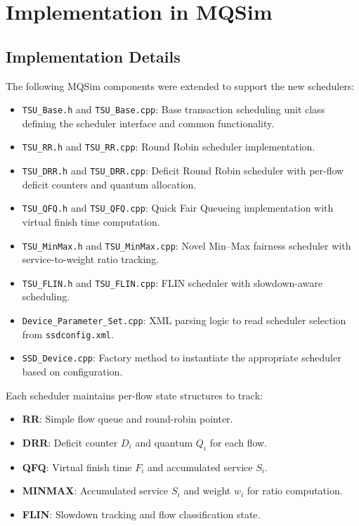 \documentclass[11pt]{article}
\begin{document}
\section{Implementation in MQSim}

\subsection{Implementation Details}

The following MQSim components were extended to support the new schedulers:

\begin{itemize}
    \item \texttt{TSU\_Base.h} and \texttt{TSU\_Base.cpp}: Base transaction scheduling unit class defining the scheduler interface and common functionality.
    \item \texttt{TSU\_RR.h} and \texttt{TSU\_RR.cpp}: Round Robin scheduler implementation.
    \item \texttt{TSU\_DRR.h} and \texttt{TSU\_DRR.cpp}: Deficit Round Robin scheduler with per-flow deficit counters and quantum allocation.
    \item \texttt{TSU\_QFQ.h} and \texttt{TSU\_QFQ.cpp}: Quick Fair Queueing implementation with virtual finish time computation.
    \item \texttt{TSU\_MinMax.h} and \texttt{TSU\_MinMax.cpp}: Novel Min--Max fairness scheduler with service-to-weight ratio tracking.
    \item \texttt{TSU\_FLIN.h} and \texttt{TSU\_FLIN.cpp}: FLIN scheduler with slowdown-aware scheduling.
    \item \texttt{Device\_Parameter\_Set.cpp}: XML parsing logic to read scheduler selection from \texttt{ssdconfig.xml}.
    \item \texttt{SSD\_Device.cpp}: Factory method to instantiate the appropriate scheduler based on configuration.
\end{itemize}

Each scheduler maintains per-flow state structures to track:
\begin{itemize}
    \item \textbf{RR}: Simple flow queue and round-robin pointer.
    \item \textbf{DRR}: Deficit counter $D_i$ and quantum $Q_i$ for each flow.
    \item \textbf{QFQ}: Virtual finish time $F_i$ and accumulated service $S_i$.
    \item \textbf{MINMAX}: Accumulated service $S_i$ and weight $w_i$ for ratio computation.
    \item \textbf{FLIN}: Slowdown tracking and flow classification state.
\end{itemize}
\end{document}
